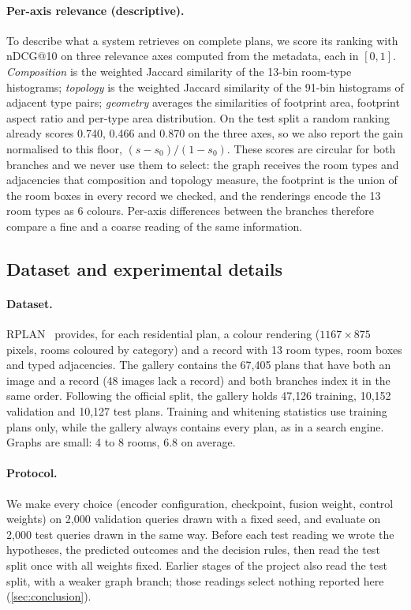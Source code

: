 \paragraph{Per-axis relevance (descriptive).}
To describe what a system retrieves on complete plans, we score its ranking with nDCG@10 on three relevance axes computed from the metadata, each in $[0,1]$.
\emph{Composition} is the weighted Jaccard similarity of the 13-bin room-type histograms; \emph{topology} is the weighted Jaccard similarity of the 91-bin histograms of adjacent type pairs; \emph{geometry} averages the similarities of footprint area, footprint aspect ratio and per-type area distribution.
On the test split a random ranking already scores 0.740, 0.466 and 0.870 on the three axes, so we also report the gain normalised to this floor, $(s-s_0)/(1-s_0)$.
These scores are circular for both branches and we never use them to select: the graph receives the room types and adjacencies that composition and topology measure, the footprint is the union of the room boxes in every record we checked, and the renderings encode the 13 room types as 6 colours.
Per-axis differences between the branches therefore compare a fine and a coarse reading of the same information.

\subsection{Dataset and experimental details}
\label{sec:setup}


\paragraph{Dataset.}
RPLAN~\cite{wu2019rplan} provides, for each residential plan, a colour rendering ($1167\times875$ pixels, rooms coloured by category) and a record with 13 room types, room boxes and typed adjacencies.
The gallery contains the 67{,}405 plans that have both an image and a record (48 images lack a record) and both branches index it in the same order.
Following the official split, the gallery holds 47{,}126 training, 10{,}152 validation and 10{,}127 test plans.
Training and whitening statistics use training plans only, while the gallery always contains every plan, as in a search engine.
Graphs are small: 4 to 8 rooms, 6.8 on average.

\paragraph{Protocol.}
We make every choice (encoder configuration, checkpoint, fusion weight, control weights) on 2{,}000 validation queries drawn with a fixed seed, and evaluate on 2{,}000 test queries drawn in the same way.
Before each test reading we wrote the hypotheses, the predicted outcomes and the decision rules, then read the test split once with all weights fixed.
Earlier stages of the project also read the test split, with a weaker graph branch; those readings select nothing reported here (\cref{sec:conclusion}).

